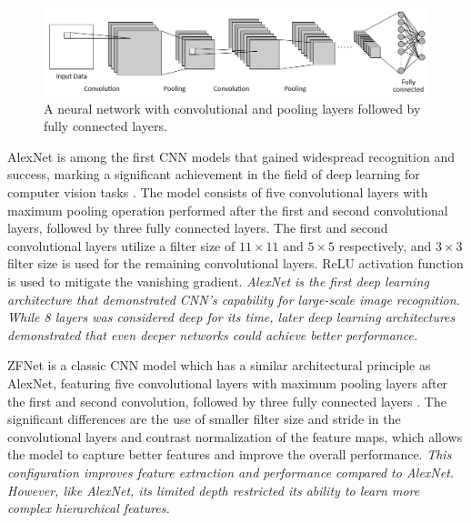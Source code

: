 \documentclass[preprint,12pt]{elsarticle}
\begin{document}
\begin{figure}[h!]
    \centering
    \includegraphics[scale=0.75]{fig_deep_sv_learning_cnn.png}
    \caption{A neural network with convolutional and pooling layers followed by fully connected layers.}
    \label{fig_deep_sv_learning_cnn}
\end{figure}

AlexNet is among the first CNN models that gained widespread recognition and success, marking a significant achievement in the field of deep learning for computer vision tasks \citep{krizhevsky_imagenet_2012}. The model consists of five convolutional layers with maximum pooling operation performed after the first and second convolutional layers, followed by three fully connected layers. The first and second convolutional layers utilize a filter size of $11 \times 11$ and $5 \times 5$ respectively, and $3 \times 3$ filter size is used for the remaining convolutional layers. ReLU activation function is used to mitigate the vanishing gradient. \emph{AlexNet is the first deep learning architecture that demonstrated CNN's capability for large-scale image recognition. While 8 layers was considered deep for its time, later deep learning architectures demonstrated that even deeper networks could achieve better performance.}

ZFNet is a classic CNN model which has a similar architectural principle as AlexNet, featuring five convolutional layers with maximum pooling layers after the first and second convolution, followed by three fully connected layers \citep{zeiler_visualizing_2013}. The significant differences are the use of smaller filter size and stride in the convolutional layers and contrast normalization of the feature maps, which allows the model to capture better features and improve the overall performance. \emph{This configuration improves feature extraction and performance compared to AlexNet. However, like AlexNet, its limited depth restricted its ability to learn more complex hierarchical features.}
\end{document}
